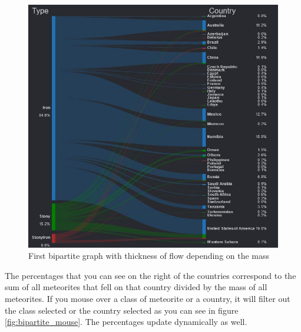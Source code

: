 \documentclass[10pt,conference,compsocconf]{IEEEtran}
\begin{document}
\begin{figure}[H]
  \centering
  \includegraphics[height=\columnwidth]{images/bipartite_mass}
  \vspace{-3mm}
  \caption{First bipartite graph with thickness of flow depending on the mass}
  \label{fig:bipartite_mass}
\end{figure}

The percentages that you can see on the right of the countries correspond to the sum of all meteorites that fell on that country divided by the mass of all meteorites. If you mouse over a class of meteorite or a country, it will filter out the class selected or the country selected as you can see in figure \ref{fig:bipartite_mouse}. The percentages update dynamically as well.
 
\end{document}
